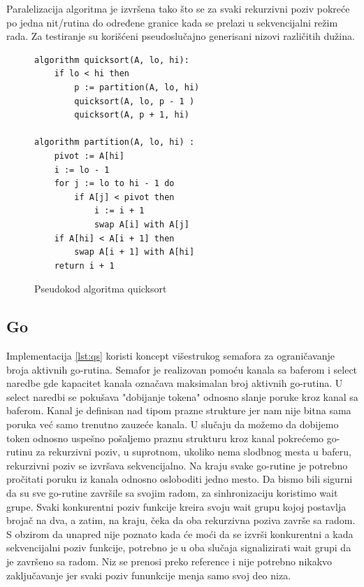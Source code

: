\documentclass[12pt,oneside]{memoir}
\begin{document}
Paralelizacija algoritma je izvršena tako što se za svaki rekurzivni poziv pokreće po jedna nit/rutina do određene granice kada se prelazi u sekvencijalni režim rada. Za testiranje su korišćeni pseudoslučajno generisani nizovi različitih dužina.

\begin{figure}
\begin{center}

\begin{Verbatim}[fontsize=\small]
algorithm quicksort(A, lo, hi):
    if lo < hi then
        p := partition(A, lo, hi)
        quicksort(A, lo, p - 1 )
        quicksort(A, p + 1, hi)

algorithm partition(A, lo, hi) :
    pivot := A[hi]
    i := lo - 1    
    for j := lo to hi - 1 do
        if A[j] < pivot then
            i := i + 1
            swap A[i] with A[j]
    if A[hi] < A[i + 1] then
        swap A[i + 1] with A[hi]
    return i + 1
\end{Verbatim}

\caption{Pseudokod algoritma quicksort}
\label{fig:qs_pseudo}
\end{center}
\end{figure}


\subsection{Go}
\label{qs:go}
Implementacija \ref{lst:qs} koristi koncept višestrukog semafora za ograničavanje broja aktivnih go-rutina. Semafor je realizovan pomoću kanala sa baferom i select naredbe gde kapacitet kanala označava maksimalan broj aktivnih go-rutina. U select naredbi se pokušava "dobijanje tokena" odnosno slanje poruke kroz kanal sa baferom. Kanal je definisan nad tipom prazne strukture jer nam nije bitna sama poruka već samo trenutno zauzeće kanala. U slučaju da možemo da dobijemo token odnosno uspešno pošaljemo praznu strukturu kroz kanal pokrećemo go-rutinu za rekurzivni poziv, u suprotnom, ukoliko nema slodbnog mesta u baferu, rekurzivni poziv se izvršava sekvencijalno. Na kraju svake go-rutine je potrebno pročitati poruku iz kanala odnosno osloboditi jedno mesto. Da bismo bili sigurni da su sve go-rutine završile sa svojim radom, za sinhronizaciju koristimo wait grupe. Svaki konkurentni poziv funkcije kreira svoju wait grupu kojoj postavlja brojač na dva, a zatim, na kraju, čeka da oba rekurzivna poziva završe sa radom. S obzirom da unapred nije poznato kada će moći da se izvrši konkurentni a kada sekvencijalni poziv funkcije, potrebno je u oba slučaja signalizirati wait grupi da je završeno sa radom. Niz se prenosi preko reference i nije potrebno nikakvo zaključavanje jer svaki poziv fununkcije menja samo svoj deo niza.
\end{document}
